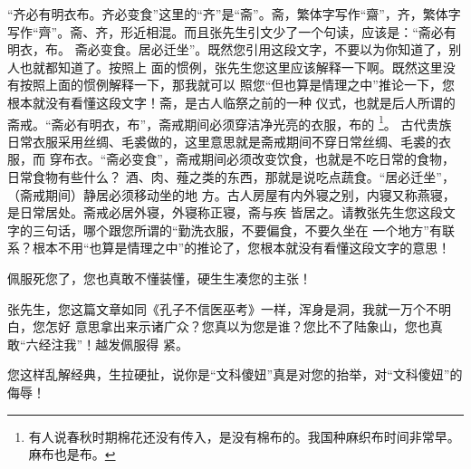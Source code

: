 “齐必有明衣布。齐必变食”这里的“齐”是“斋”。斋，繁体字写作“齋”，齐，繁体字
写作“齊”。斋、齐，形近相混。而且张先生引文少了一个句读，应该是：“斋必有明衣，布。
斋必变食。居必迁坐”。既然您引用这段文字，不要以为你知道了，别人也就都知道了。按照上
面的惯例，张先生您这里应该解释一下啊。既然这里没有按照上面的惯例解释一下，那我就可以
照您“但也算是情理之中”推论一下，您根本就没有看懂这段文字！斋，是古人临祭之前的一种
仪式，也就是后人所谓的斋戒。“斋必有明衣，布”，斋戒期间必须穿洁净光亮的衣服，布的
\footnote{有人说春秋时期棉花还没有传入，是没有棉布的。我国种麻织布时间非常早。麻布也是布。}。
古代贵族日常衣服采用丝绸、毛裘做的，这里意思就是斋戒期间不穿日常丝绸、毛裘的衣服，而
穿布衣。“斋必变食”，斋戒期间必须改变饮食，也就是不吃日常的食物，日常食物有些什么？
酒、肉、薤之类的东西，那就是说吃点蔬食。“居必迁坐”，（斋戒期间）静居必须移动坐的地
方。古人房屋有内外寝之别，内寝又称燕寝，是日常居处。斋戒必居外寝，外寝称正寝，斋与疾
皆居之。请教张先生您这段文字的三句话，哪个跟您所谓的“勤洗衣服，不要偏食，不要久坐在
一个地方”有联系？根本不用“也算是情理之中”的推论了，您根本就没有看懂这段文字的意思！

佩服死您了，您也真敢不懂装懂，硬生生凑您的主张！

张先生，您这篇文章如同《孔子不信医巫考》一样，浑身是洞，我就一万个不明白，您怎好
意思拿出来示诸广众？您真以为您是谁？您比不了陆象山，您也真敢“六经注我”！越发佩服得
紧。

您这样乱解经典，生拉硬扯，说你是“文科傻妞”真是对您的抬举，对“文科傻妞”的侮辱！
